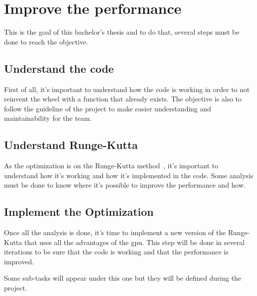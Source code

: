 \section{Improve the performance}
\label{spec:ch:activities:improve-the-performance}

This is the goal of this bachelor's thesis and to do that, several steps must be done to reach the objective.


\subsection{Understand the code}
\label{spec:ch:activities:improve-the-performance:understand-the-code}

First of all, it's important to understand how the code is working in order to not reinvent the wheel with a function that already exists.
The objective is also to follow the guideline of the project to make easier understanding and maintainability for the team.


\subsection{Understand Runge-Kutta}
\label{spec:ch:activities:improve-the-performance:understand-runge-kutta}

As the optimization is on the Runge-Kutta method~\cite{Runge-Kutta-methods}, it's important to understand how it's working and how it's implemented in the code.
Some analysis must be done to know where it's possible to improve the performance and how.


\subsection{Implement the Optimization}
\label{spec:ch:activities:improve-the-performance:implement-the-optimization}

Once all the analysis is done, it's time to implement a new version of the Runge-Kutta that uses all the advantages of the \acrshort{gpu}.
This step will be done in several iterations to be sure that the code is working and that the performance is improved.

Some sub-tasks will appear under this one but they will be defined during the project.


